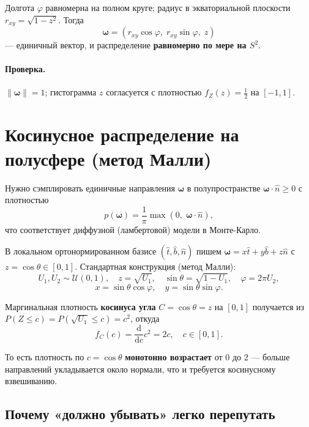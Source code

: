 \documentclass[12pt,a4paper]{article}
\begin{document}
Долгота $\varphi$ равномерна на полном круге; радиус в экваториальной плоскости $r_{xy} = \sqrt{1-z^2}$. Тогда
\[
\boldsymbol{\omega} = (r_{xy}\cos\varphi,\; r_{xy}\sin\varphi,\; z)
\]
--- единичный вектор, и распределение \textbf{равномерно по мере на $S^2$}.

\paragraph{Проверка.}
$\|\boldsymbol{\omega}\| = 1$; гистограмма $z$ согласуется с плотностью $f_Z(z) = \tfrac{1}{2}$ на $[-1,1]$.

\section{Косинусное распределение на полусфере (метод Малли)}

Нужно сэмплировать единичные направления $\boldsymbol{\omega}$ в полупространстве $\boldsymbol{\omega}\cdot \hat n \ge 0$ с плотностью
\[
p(\boldsymbol{\omega}) = \frac{1}{\pi}\max(0,\; \boldsymbol{\omega}\cdot \hat n),
\]
что соответствует диффузной (ламбертовой) модели в Монте-Карло.

В локальном ортонормированном базисе $(\hat t,\hat b,\hat n)$ пишем $\boldsymbol{\omega} = x\hat t + y\hat b + z\hat n$ с $z = \cos\theta \in [0,1]$. Стандартная конструкция (метод Малли):
\[
U_1, U_2 \sim \mathcal{U}(0,1),\quad
z = \sqrt{U_1},\quad
\sin\theta = \sqrt{1-U_1},\quad
\varphi = 2\pi U_2,
\]
\[
x = \sin\theta\cos\varphi,\quad y = \sin\theta\sin\varphi.
\]

Маргинальная плотность \textbf{косинуса угла} $C = \cos\theta = z$ на $[0,1]$ получается из $P(Z \le c) = P(\sqrt{U_1} \le c) = c^2$, откуда
\[
f_C(c) = \frac{\mathrm{d}}{\mathrm{d}c} c^2 = 2c,\quad c \in [0,1].
\]

То есть плотность по $c = \cos\theta$ \textbf{монотонно возрастает} от $0$ до $2$ --- больше направлений укладывается около нормали, что и требуется косинусному взвешиванию.

\subsection{Почему «должно убывать» легко перепутать}
\end{document}
